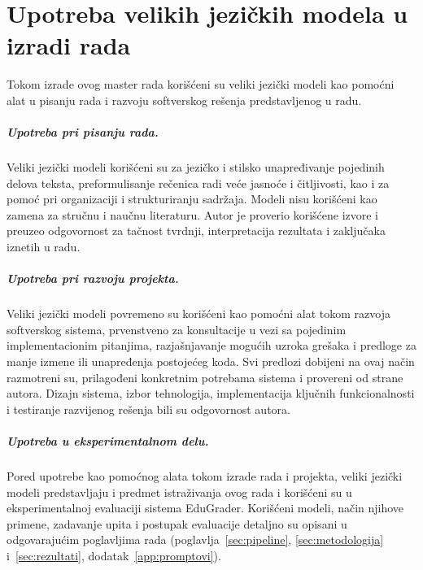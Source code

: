 \chapter{Upotreba velikih jezičkih modela u izradi rada}
\label{app:llm}

Tokom izrade ovog master rada korišćeni su veliki jezički modeli kao pomoćni alat u pisanju rada
i razvoju softverskog rešenja predstavljenog u radu.

\paragraph{Upotreba pri pisanju rada.}
Veliki jezički modeli korišćeni su za jezičko i stilsko unapređivanje pojedinih delova teksta,
preformulisanje rečenica radi veće jasnoće i čitljivosti, kao i za pomoć pri organizaciji i strukturiranju sadržaja.
Modeli nisu korišćeni kao zamena za stručnu i naučnu literaturu.
Autor je proverio korišćene izvore i preuzeo odgovornost za tačnost tvrdnji, interpretacija rezultata i zaključaka iznetih u radu.

\paragraph{Upotreba pri razvoju projekta.}
Veliki jezički modeli povremeno su korišćeni kao pomoćni alat tokom razvoja softverskog sistema,
prvenstveno za konsultacije u vezi sa pojedinim implementacionim pitanjima,
razjašnjavanje mogućih uzroka grešaka i predloge za manje izmene ili unapređenja postojećeg koda.
Svi predlozi dobijeni na ovaj način razmotreni su, prilagođeni konkretnim potrebama sistema i provereni od strane autora.
Dizajn sistema, izbor tehnologija, implementacija ključnih funkcionalnosti i testiranje razvijenog rešenja bili su odgovornost autora.

\paragraph{Upotreba u eksperimentalnom delu.}
Pored upotrebe kao pomoćnog alata tokom izrade rada i projekta,
veliki jezički modeli predstavljaju i predmet istraživanja ovog rada i korišćeni su u eksperimentalnoj evaluaciji sistema EduGrader.
Korišćeni modeli, način njihove primene, zadavanje upita i postupak evaluacije detaljno su opisani u odgovarajućim poglavljima rada
(poglavlja~\ref{sec:pipeline}, \ref{sec:metodologija} i~\ref{sec:rezultati}, dodatak~\ref{app:promptovi}).

